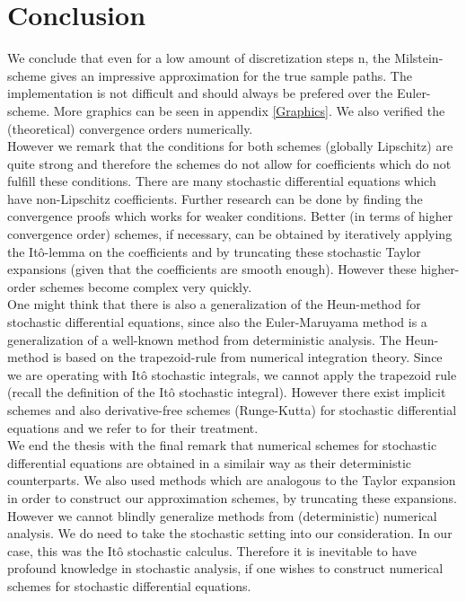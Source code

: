 \section{Conclusion}

We conclude that even for a low amount of discretization steps n, the Milstein-scheme gives an impressive approximation for the true sample paths. The implementation is not difficult and should always be prefered over the Euler-scheme.
More graphics can be seen in appendix \ref{Graphics}. We also verified the (theoretical) convergence orders numerically.\\

However we remark that the conditions for both schemes (globally Lipschitz) are quite strong and therefore the schemes do not allow for coefficients which do not fulfill these conditions. There are many stochastic differential equations which have non-Lipschitz coefficients. Further research can be done by finding the convergence proofs which works for weaker conditions. Better (in terms of higher convergence order) schemes, if necessary, can be obtained by iteratively applying the It\^o-lemma on the coefficients and by truncating these stochastic Taylor expansions (given that the coefficients are smooth enough). However these higher-order schemes become complex very quickly.\\

One might think that there is also a generalization of the Heun-method for stochastic differential equations, since also the Euler-Maruyama method is a generalization of a well-known method from deterministic analysis. The Heun-method is based on the trapezoid-rule from numerical integration theory. Since we are operating with It\^o stochastic integrals, we cannot apply the trapezoid rule (recall the definition of the It\^o stochastic integral). However there exist implicit schemes and also derivative-free schemes (Runge-Kutta) for stochastic differential equations and we refer to \cite{KloedenPlaten} for their treatment.\\

We end the thesis with the final remark that numerical schemes for stochastic differential equations are obtained in a similair way as their deterministic counterparts. We also used methods which are analogous to the Taylor expansion in order to construct our approximation schemes, by truncating these expansions. However we cannot blindly generalize methods from (deterministic) numerical analysis. We do need to take the stochastic setting into our consideration. In our case, this was the It\^o stochastic calculus.
Therefore it is inevitable to have profound knowledge in stochastic analysis, if one wishes to construct numerical schemes for stochastic differential equations.











